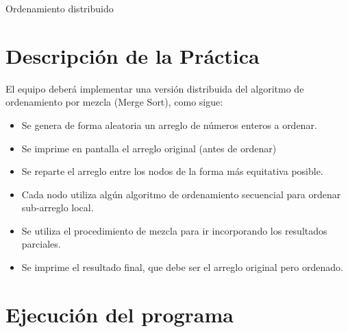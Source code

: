 \documentclass[a4paper,12pt]{article}
\begin{document}


\newpage

\begin{center}
    {\huge Ordenamiento distribuido}
\end{center}


\section*{Descripción de la Práctica}


El equipo deberá implementar una versión distribuida del algoritmo de ordenamiento por
mezcla (Merge Sort), como sigue:
\begin{itemize}
    \item Se genera de forma aleatoria un arreglo de números enteros a ordenar.
    \item Se imprime en pantalla el arreglo original (antes de ordenar)
    \item Se reparte el arreglo entre los nodos de la forma más equitativa posible.
    \item Cada nodo utiliza algún algoritmo de ordenamiento secuencial para ordenar sub-arreglo local.
    \item Se utiliza el procedimiento de mezcla para ir incorporando los resultados parciales.
    \item Se imprime el resultado final, que debe ser el arreglo original pero ordenado.
\end{itemize}



\section*{Ejecución del programa}

\end{document}
